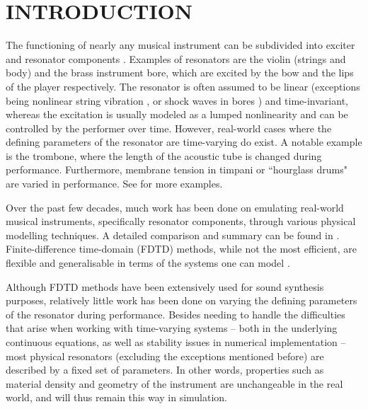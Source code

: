 \documentclass[fleqn]{jaes}
\begin{document}
\section{INTRODUCTION}\label{sec:introduction}

The functioning of nearly any musical instrument can be subdivided into exciter and resonator components \cite{mcintyre1983oscillations, Borin1989}. Examples of resonators are the violin (strings and body) and the brass instrument bore, which are excited by the bow and the lips of the player respectively. The resonator is often assumed to be linear (exceptions being nonlinear string vibration \cite{Carrier1945}, or shock waves in bores \cite{Hirschberg1996}) and time-invariant, whereas the excitation is usually modeled as a lumped nonlinearity and can be controlled by the performer over time. However, real-world cases where the defining parameters of the resonator are time-varying do exist.
A notable example is the trombone, where the length of the acoustic tube is changed during performance. Furthermore, membrane tension in timpani or ``hourglass drums" %
are varied in performance. %
See \cite[Sec. 12.4]{Willemsen2021Thesis} for more examples. 

Over the past few decades, much work has been done on emulating real-world musical instruments, specifically resonator components, through various physical modelling techniques. A detailed comparison and summary can be found in \cite{valimaki2005discrete}. Finite-difference time-domain (FDTD) methods, while not the most efficient, are flexible and generalisable in terms of the systems one can model \cite{Bilbao2009}.

Although FDTD methods have been extensively used for sound synthesis purposes, relatively little work has been done on varying the defining parameters of the resonator during performance. Besides needing to handle the difficulties that arise when working with time-varying systems -- both in the underlying continuous equations, as well as stability issues in numerical implementation -- most physical resonators (excluding the exceptions mentioned before) are described by a fixed set of parameters. In other words, properties such as material density and geometry of the instrument are unchangeable in the real world, and will thus remain this way in simulation. %
\end{document}
